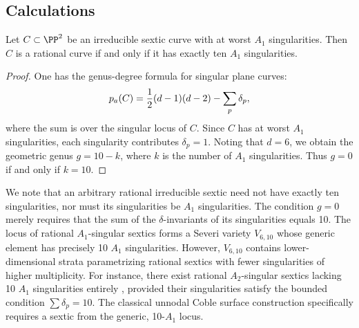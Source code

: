 \documentclass[../../main.tex]{subfiles}
\begin{document}
\subsection{Calculations}

\begin{lemma}\label{lem:rational_sextic_ten_nodes}
    Let $C \subset \PP^2$ be an irreducible sextic curve with at worst $A_1$ singularities. Then $C$ is a rational curve if and only if it has exactly ten $A_1$ singularities.
\end{lemma}

\begin{proof}
    One has the genus-degree formula for singular plane curves:
    \[
    p_a(C) = {1\over 2}(d-1)(d-2) - \sum_p \delta_p
    ,\]
    where the sum is over the singular locus of $C$. Since $C$ has at worst $A_1$ singularities, each singularity contributes $\delta_p = 1$. Noting that $d=6$, we obtain the geometric genus $g = 10 - k$, where $k$ is the number of $A_1$ singularities. Thus $g = 0$ if and only if $k = 10$.
\end{proof}

\begin{remark}\label{rmk:severi-sextics}
    We note that an arbitrary rational irreducible sextic need not have exactly ten singularities, nor must its singularities be $A_1$ singularities. The condition $g=0$ merely requires that the sum of the $\delta$-invariants of its singularities equals 10. The locus of rational $A_1$-singular sextics forms a Severi variety $V_{6,10}$ \cite{BHO+11} whose generic element has precisely 10 $A_1$ singularities. However, $V_{6,10}$ contains lower-dimensional strata parametrizing rational sextics with fewer singularities of higher multiplicity. For instance, there exist rational $A_2$-singular sextics lacking 10 $A_1$ singularities entirely \cite{GK20}, provided their singularities satisfy the bounded condition $\sum \delta_p = 10$. The classical unnodal Coble surface construction specifically requires a sextic from the generic, 10-$A_1$ locus.
\end{remark}
\end{document}
